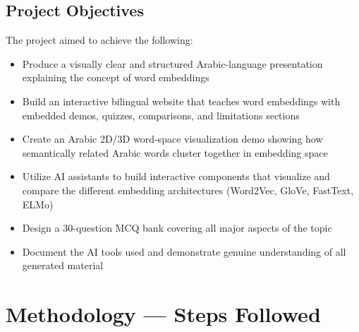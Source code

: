 \subsection{Project Objectives}
The project aimed to achieve the following:
\begin{itemize}
    \item Produce a visually clear and structured Arabic-language presentation explaining the concept of word embeddings
    \item Build an interactive bilingual website that teaches word embeddings with embedded demos, quizzes, comparisons, and limitations sections
    \item Create an Arabic 2D/3D word-space visualization demo showing how semantically related Arabic words cluster together in embedding space
    \item Utilize AI assistants to build interactive components that visualize and compare the different embedding architectures (Word2Vec, GloVe, FastText, ELMo)
    \item Design a 30-question MCQ bank covering all major aspects of the topic
    \item Document the AI tools used and demonstrate genuine understanding of all generated material
\end{itemize}

\section{Methodology — Steps Followed}

